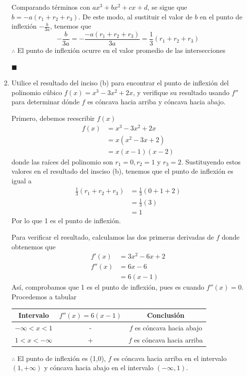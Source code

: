 \documentclass[12pt]{article}
\begin{document}
\begin{enumerate}[label=(\alph*)]
  Comparando términos con $ax^3 + bx^2 + cx + d$, se sigue que $b=-a(r_1+r_2+r_3)$. De este modo, al sustituir el valor de $b$ en el punto de inflexión $-\frac{b}{3a}$, tenemos que
  \[
  -\frac{b}{3a}= -\frac{-a(r_1+r_2+r_3)}{3a}=\frac{1}{3}(r_1+r_2+r_3)
  \]
  $\therefore $ El punto de inflexión ocurre en el valor promedio de las intersecciones
  \begin{flushright}
    $\blacksquare$
  \end{flushright}


\item Utilice el resultado del inciso (b) para encontrar el punto de inflexión del polinomio cúbico $f(x) = x^3-3x^2 + 2x$, y verifique su resultado usando $f''$ para determinar dónde $f$ es cóncava hacia arriba y cóncava hacia abajo.

  Primero, debemos reescribir $f(x)$
  \begin{align*}
    f(x)
    &= x^3-3x^2 + 2x\\
    &=x(x^2-3x+2)\\
    &=x(x-1)(x-2)
  \end{align*}
  donde las raíces del polinomio son $r_1=0,r_2=1$ y $r_3=2$. Sustituyendo estos valores en el resultado del insciso (b), tenemos que el punto de inflexión es igual a
  \begin{align*}
    \frac{1}{3}(r_1+r_2+r_3)
    &= \frac{1}{3}(0+1+2) \\
    &= \frac{1}{3}(3) \\
    &= 1
  \end{align*}
  Por lo que 1 es el punto de inflexión.

  Para verificar el resultado, calculamos las dos primeras derivadas de $f$ donde obtenemos que
  \begin{align*}
    f'(x)
    &= 3x^2 - 6x +2\\
    f''(x)
    &= 6x -6 \\
    &= 6 (x-1)
  \end{align*}
  Así, comprobamos que 1 es el punto de inflexión, pues es cuando $f''(x)=0$. Procedemos a tabular
  \begin{table}[H]
    \centering
    \begin{tabular}{c|c|c}
      \hline
      Intervalo & $f''(x) = 6(x-1)$ & Conclusión \\
      \hline
      $-\infty<x<1$ & - & $f$ es cóncava hacia abajo \\
      $1<x<-\infty$ & + & $f$ es cóncava hacia arriba \\
      \hline
    \end{tabular}
  \end{table}
  $\therefore $ El punto de inflexión es (1,0), $f$ es cóncava hacia arriba en el intervalo $(1,+\infty)$ y cóncava hacia abajo en el intervalo $(-\infty,1)$.
  
\end{enumerate}
\end{document}
